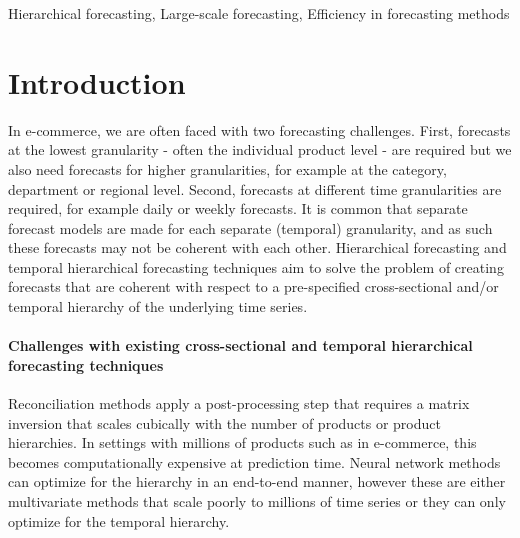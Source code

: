\documentclass[preprint, 3p, times, twocolumn]{elsarticle}
\begin{document}
\begin{frontmatter}
\begin{abstract}
\end{abstract}

\begin{keyword}
  Hierarchical forecasting, Large-scale forecasting, Efficiency in forecasting methods
\end{keyword}

\end{frontmatter}

\section{Introduction} \label{sec:intro}
In e-commerce, we are often faced with two forecasting challenges. First, forecasts at the lowest granularity - often the individual product level - are required but we also need forecasts for higher granularities, for example at the category, department or regional level. Second, forecasts at different time granularities are required, for example daily or weekly forecasts. It is common that separate forecast models are made for each separate (temporal) granularity, and as such these forecasts may not be coherent with each other. Hierarchical forecasting \cite{hyndman_optimal_2011} and temporal hierarchical forecasting techniques \cite{athanasopoulos_forecasting_2017,rangapuram_coherent_2023,theodosiou_forecasting_2021} aim to solve the problem of creating forecasts that are coherent with respect to a pre-specified cross-sectional and/or temporal hierarchy of the underlying time series. 


\paragraph{Challenges with existing cross-sectional and temporal hierarchical forecasting techniques} Reconciliation methods \cite{hyndman_optimal_2011,athanasopoulos_forecasting_2017,wickramasuriya_optimal_2019} apply a post-processing step that requires a matrix inversion that scales cubically with the number of products or product hierarchies. In settings with millions of products such as in e-commerce, this becomes computationally expensive at prediction time. Neural network methods can optimize for the hierarchy in an end-to-end manner, however these are either multivariate methods that scale poorly to millions of time series \cite{rangapuram_endtoend_2021} or they can only optimize for the temporal hierarchy.\cite{rangapuram_coherent_2023}
  
\end{document}
